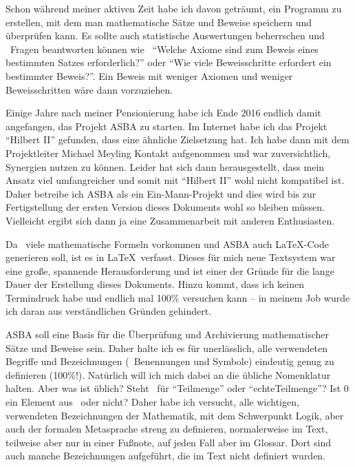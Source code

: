 Schon während meiner aktiven Zeit habe ich davon geträumt, ein Programm zu erstellen, mit dem man mathematische Sätze und Beweise speichern und überprüfen kann.
Es sollte auch statistische Auswertungen beherrschen und \textua\ Fragen beantworten können wie \textzB\
"`Welche Axiome sind zum Beweis eines bestimmten Satzes erforderlich?"' oder
"`Wie viele Beweisschritte erfordert ein bestimmter Beweis?"'.
Ein Beweis mit weniger Axiomen und weniger Beweisschritten wäre dann vorzuziehen.

Einige Jahre nach meiner Pensionierung habe ich Ende 2016 endlich damit angefangen, das Projekt ASBA zu starten.
Im Internet habe ich das Projekt "`Hilbert II"' \cite{bib:HilbertII} gefunden, dass eine ähnliche Zielsetzung hat.
Ich habe dann mit dem Projektleiter Michael Meyling Kontakt aufgenommen und war zuversichtlich, Synergien nutzen zu können.
Leider hat sich dann herausgestellt, dass mein Ansatz viel umfangreicher und somit mit "`Hilbert II"' wohl nicht kompatibel ist.
Daher betreibe ich ASBA als ein Ein-Mann-Projekt und dies wird bis zur Fertigstellung der ersten Version dieses Dokuments wohl so bleiben müssen.
Vielleicht ergibt sich dann ja eine Zusammenarbeit mit anderen Enthusiasten.

Da \hier\ viele mathematische Formeln vorkommen und ASBA auch \LaTeX-Code generieren soll, ist es in \LaTeX\ verfasst.
Dieses für mich neue Textsystem war eine große, spannende Herausforderung und ist einer der Gründe für die lange Dauer der Erstellung dieses Dokuments.
Hinzu kommt, dass ich keinen Termindruck habe und endlich mal 100\% versuchen kann -- in meinem Job wurde ich daran aus verständlichen Gründen gehindert.

ASBA soll eine Basis für die Überprüfung und Archivierung mathematischer Sätze und Beweise sein.
Daher halte ich es für unerlässlich, alle verwendeten Begriffe und Bezeichnungen (\textdh\ Benennungen und Symbole) eindeutig genug zu definieren (100\%!).
Natürlich will ich mich dabei an die übliche Nomenklatur halten.
Aber was ist üblich?
Steht \MtsSubset\ für "`Teilmenge"' oder "`echteTeilmenge"'?
Ist $0$ ein Element aus \MtsIN\ oder nicht?
Daher habe ich versucht, alle wichtigen, verwendeten Bezeichnungen der Mathematik, mit dem Schwerpunkt Logik, aber auch der formalen Metasprache streng zu definieren, normalerweise im Text, teilweise aber nur in einer Fußnote, auf jeden Fall aber im Glossar.
Dort sind auch manche Bezeichnungen aufgeführt, die im Text nicht definiert wurden.

\bigskip

